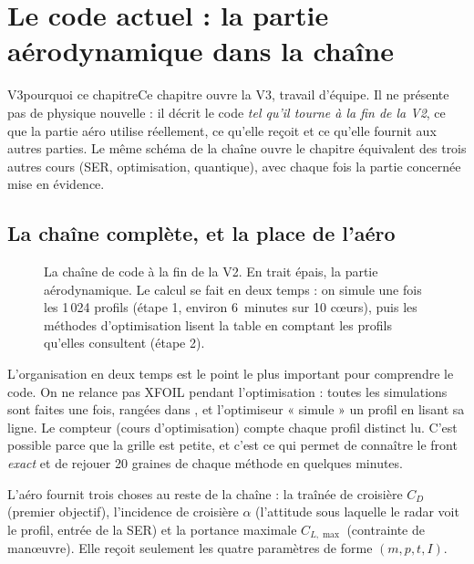 \chapter{Le code actuel : la partie aérodynamique dans la chaîne}\label{ch:code-actuel}


\begin{evolution}{V3}{pourquoi ce chapitre}Ce chapitre ouvre la V3, travail d'équipe. Il ne présente pas de physique nouvelle : il décrit le code \emph{tel qu'il tourne à la fin de la V2}, ce que la partie aéro utilise réellement, ce qu'elle reçoit et ce qu'elle fournit aux autres parties. Le même schéma de la chaîne ouvre le chapitre équivalent des trois autres cours (SER, optimisation, quantique), avec chaque fois la partie concernée mise en évidence.\end{evolution}

\section{La chaîne complète, et la place de l'aéro}
\begin{figure}[htbp]
\centering
{}
\caption{La chaîne de code à la fin de la V2. En trait épais, la partie aérodynamique. Le calcul se fait en deux temps : on simule une fois les 1\,024 profils (étape 1, environ 6~minutes sur 10 cœurs), puis les méthodes d'optimisation lisent la table en comptant les profils qu'elles consultent (étape 2).}\label{fig:chaine-aero}
\end{figure}

L'organisation en deux temps est le point le plus important pour comprendre le code. On ne relance pas XFOIL pendant l'optimisation : toutes les simulations sont faites une fois, rangées dans , et l'optimiseur « simule » un profil en lisant sa ligne. Le compteur  (cours d'optimisation) compte chaque profil distinct lu. C'est possible parce que la grille est petite, et c'est ce qui permet de connaître le front \emph{exact} et de rejouer 20 graines de chaque méthode en quelques minutes.

\begin{projet}
L'aéro fournit trois choses au reste de la chaîne : la traînée de croisière $C_D$ (premier objectif), l'incidence de croisière $\alpha$ (l'attitude sous laquelle le radar voit le profil, entrée de la SER) et la portance maximale $C_{L,\max}$ (contrainte de manœuvre). Elle reçoit seulement les quatre paramètres de forme $(m,p,t,I)$.
\end{projet}

